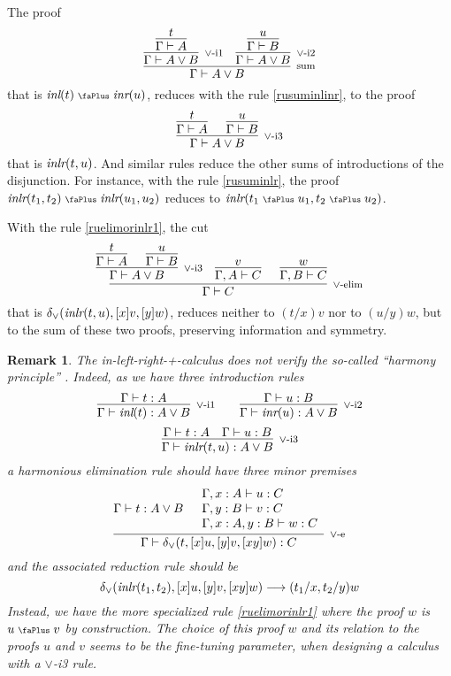 \documentclass[screen, sigconf,authorversion,nonacm]{acmart}
\theoremstyle{acmdefinition}
\newtheorem{remark}[theorem]{Remark}}
\numberwithin{equation}{section}
\newcommand\irule[3]{\infer[\mbox{\footnotesize $#3$}]{#2}{#1}}
\newcommand\abstr[1]{[#1]}
\newcommand\inl{\mbox{\it inl}}
\newcommand\inr{\mbox{\it inr}}
\newcommand\inlr{\mbox{\it inlr}}
\newcommand\elimor{\delta_{\vee}}
\newcommand\plus{\mathrel{\text{\normalfont\scalebox{0.7}{\faPlus}}}}
\begin{document}
The proof
$$\irule{\irule{\irule{t}
                      {\Gamma \vdash A}
                      {}
               }
               {\Gamma \vdash A \vee B}
               {\mbox{$\vee$-i1}}
       &\irule{\irule{u}
                     {\Gamma \vdash B}
                     {}
              }
              {\Gamma \vdash A \vee B}
              {\mbox{$\vee$-i2}}
       }
       {\Gamma \vdash A \vee B}
       {\mbox{sum}}$$
that is $\inl(t) \plus \inr(u)$, reduces with the rule \eqref{rusuminlinr},
to the proof
$$\irule{\irule{t}
               {\Gamma \vdash A}
               {}
               &
         \irule{u}
               {\Gamma \vdash B}
               {}
        }
        {\Gamma \vdash A \vee B}
        {\mbox{$\vee$-i3}}$$
that is $\inlr(t,u)$. And similar rules reduce the other sums of
introductions of the disjunction. For instance, with the rule
\eqref{rusuminlr}, the proof $\inlr(t_1,t_2) \plus \inlr(u_1,u_2)$
reduces to $\inlr(t_1 \plus u_1, t_2 \plus u_2)$.

With the rule \eqref{ruelimorinlr1}, the cut
$$\irule{\irule{\irule{t}
                      {\Gamma \vdash A}
                      {}
               &\irule{u}
                      {\Gamma \vdash B}
                      {}
               }
               {\Gamma \vdash A \vee B}
               {\mbox{$\vee$-i3}}
        &\irule{v}{\Gamma, A \vdash C}{}
        &\irule{w}{\Gamma, B \vdash C}{}
        }
        {\Gamma \vdash C}
        {\mbox{$\vee$-elim}}$$
that is 
$\elimor(\inlr(t,u), \abstr{x}v, \abstr{y}w)$,
reduces neither to $(t/x)v$ nor to $(u/y)w$, but to the sum of
these two proofs, preserving information and symmetry.

\begin{remark}
The in-left-right-+-calculus does not verify the so-called ``harmony
principle''
\cite{Gentzen,Prawitz,PrawitzEssay,Dummett,SchroederHeister,SchroederHeister2014,MillerPimentel,Read04,Read10,Read,MartinLof}. Indeed,
as we have three introduction rules
$$\irule{\Gamma \vdash t:A}
  {\Gamma \vdash \inl(t):A \vee B}
  {\mbox{$\vee$-i1}}
\qquad
\irule{\Gamma \vdash u:B}
  {\Gamma \vdash \inr(u):A \vee B}
  {\mbox{$\vee$-i2}}
  $$
  $$
\irule{\Gamma \vdash t:A & \Gamma \vdash u:B}
  {\Gamma \vdash \inlr(t,u):A \vee B}
  {\mbox{$\vee$-i3}}$$
a harmonious elimination rule should have three minor premises
$$\irule{\Gamma \vdash t:A \vee B
  &
  \begin{array}{l}
    \Gamma, x:A \vdash u:C\\
    \Gamma, y:B \vdash v:C\\
    \Gamma, x:A, y:B \vdash w:C
  \end{array}
      }
  {\Gamma \vdash \elimor(t,\abstr{x}u,\abstr{y}v,\abstr{xy}w):C}
  {\mbox{$\vee$-e}}$$
and the associated reduction rule should be
$$\elimor(\inlr(t_1,t_2),\abstr{x}u,\abstr{y}v,\abstr{xy} w) \longrightarrow
(t_1/x,t_2/y)w$$
Instead, we have the more specialized rule \eqref{ruelimorinlr1} where
the proof $w$ is $u \plus v$ by construction.  The choice of this
proof $w$ and its relation to the proofs $u$ and $v$ seems to be the
fine-tuning parameter, when designing a calculus with a $\vee$-i3
rule.
\end{remark}
\end{document}
